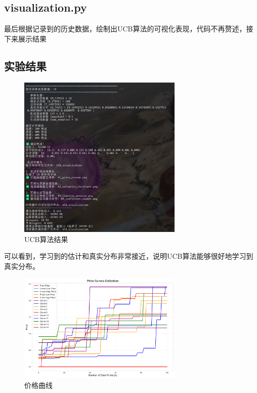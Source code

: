 \subsection{visualization.py}

最后根据记录到的历史数据，绘制出UCB算法的可视化表现，代码不再赘述，接下来展示结果


\subsection{实验结果}

\begin{figure}[H]
    \centering
    \includegraphics[width=0.7\textwidth]{figures/UCB1.png}
    \caption{UCB算法结果}
\end{figure}

可以看到，学习到的估计和真实分布非常接近，说明UCB算法能够很好地学习到真实分布。

\begin{figure}[H]
    \centering
    \includegraphics[width=0.7\textwidth]{figures/01_price_curves.png}
    \caption{价格曲线}
\end{figure}


